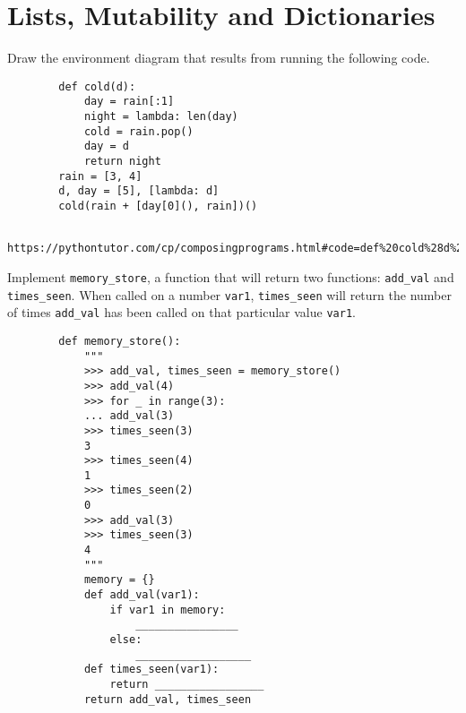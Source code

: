 \documentclass{exam}
\begin{document}
\section{Lists, Mutability and Dictionaries}
    \begin{blocksection}
        Draw the environment diagram that results from running the following code.
        
        \begin{lstlisting}
        def cold(d):
            day = rain[:1]
            night = lambda: len(day)
            cold = rain.pop()
            day = d
            return night
        rain = [3, 4]
        d, day = [5], [lambda: d]
        cold(rain + [day[0](), rain])()
        \end{lstlisting}
    \end{blocksection}
    \begin{solution}
        \begin{lstlisting}
            https://pythontutor.com/cp/composingprograms.html#code=def%20cold%28d%29%3A%0A%20%20%20%20day%20%3D%20rain%5B%3A1%5D%0A%20%20%20%20night%20%3D%20lambda%3A%20len%28day%29%0A%20%20%20%20cold%20%3D%20rain.pop%28%29%0A%20%20%20%20day%20%3D%20d%0A%20%20%20%20return%20night%0Arain%20%3D%20%5B3,%204%5D%0Ad,%20day%20%3D%20%5B5%5D,%20%5Blambda%3A%20d%5D%0Acold%28rain%20%2B%20%5Bday%5B0%5D%28%29,%20rain%5D%29%28%29&cumulative=true&curInstr=17&mode=display&origin=composingprograms.js&py=3&rawInputLstJSON=%5B%5D
        \end{lstlisting}
    \end{solution}
    \begin{blocksection}
        Implement \lstinline{memory_store}, a function that will return two functions: \lstinline{add_val} and \lstinline{times_seen}. When called on a number \lstinline{var1}, \lstinline{times_seen} will return the number of times \lstinline{add_val} has been called on that particular value \lstinline{var1}.
        
        \begin{lstlisting}
        def memory_store():
            """
            >>> add_val, times_seen = memory_store()
            >>> add_val(4)
            >>> for _ in range(3):
            ... add_val(3)
            >>> times_seen(3)
            3
            >>> times_seen(4)
            1
            >>> times_seen(2)
            0
            >>> add_val(3)
            >>> times_seen(3)
            4
            """
            memory = {}
            def add_val(var1):
                if var1 in memory:
                    ________________
                else:
                    __________________
            def times_seen(var1):
                return _________________
            return add_val, times_seen
        \end{lstlisting}
    \end{blocksection}
\end{document}
